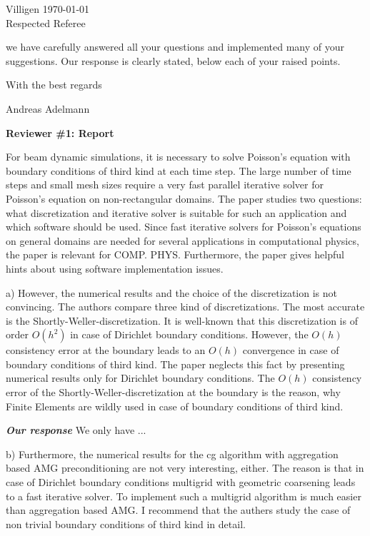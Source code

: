 \documentclass[10pt]{report}
\begin{document}
 Villigen \today \\
 
 Respected Referee
 
 we have carefully answered all your questions and implemented many of your
 suggestions. Our response is clearly stated, below each of your raised points.
 
 With the best regards

Andreas Adelmann

{\bf Reviewer \#1: Report}

For beam dynamic simulations, it is necessary to solve Poisson's equation with
boundary conditions of third kind at each time step.  The large number of time
steps and small mesh sizes require a very fast parallel iterative solver for
Poisson's equation on non-rectangular domains. The paper studies two questions:
what discretization and iterative solver is suitable for such an application and
which software should be used. Since fast iterative solvers for Poisson's
equations on general domains are needed for several applications in
computational physics, the paper is relevant for COMP. PHYS. Furthermore, the
paper gives helpful hints about using software implementation issues. 

a) However, the numerical results and the choice of the discretization is not
convincing.  The authors compare three kind of discretizations.  The most
accurate is the Shortly-Weller-discretization. It is well-known that this
discretization is of order $O(h^2)$ in case of Dirichlet boundary conditions.
However, the $O(h)$ consistency error at the boundary leads to an $O(h)$
convergence in case of boundary conditions of third kind.  The paper neglects
this fact by presenting numerical results only for Dirichlet boundary
conditions. The $O(h)$ consistency error of the Shortly-Weller-discretization at
the boundary is the reason, why Finite Elements are wildly used in case of
boundary conditions of third kind.

{\it {\bf Our response}} We only have ...


b) Furthermore, the numerical results for the cg algorithm with aggregation
based AMG preconditioning are not very interesting, either. The reason is that
in case of Dirichlet boundary conditions multigrid with geometric coarsening
leads to a fast iterative solver.  To implement such a multigrid algorithm is
much easier than aggregation based AMG. I recommend that the authers study the
case of non trivial boundary conditions of third kind in detail. 
\end{document}
